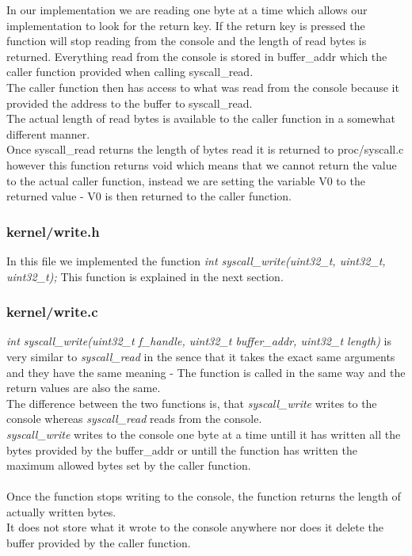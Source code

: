 \documentclass[a4paper,12pt,danish]{report}
\begin{document}
In our implementation we are reading one byte at a time which allows our implementation to look for the return key. If the return key is pressed the function will stop reading from the console and the length of read bytes is returned. Everything read from the console is stored in buffer\_addr which the caller function provided when calling syscall\_read.\\
The caller function then has access to what was read from the console because it provided the address to the buffer to syscall\_read.
\\
The actual length of read bytes is available to the caller function in a somewhat different manner.
\\
Once syscall\_read returns the length of bytes read it is returned to proc/syscall.c however this function returns void which means that we cannot return the value to the actual caller function, instead we are setting the variable V0 to the returned value - V0 is then returned to the caller function.
\subsubsection{kernel/write.h}
In this file we implemented the function \textit{int syscall\_write(uint32\_t, uint32\_t, uint32\_t);}
This function is explained in the next section.
\subsubsection{kernel/write.c}
\textit{int syscall\_write(uint32\_t f\_handle, uint32\_t buffer\_addr, uint32\_t length)} is very similar to \textit{syscall\_read} in the sence that it takes the exact same arguments and they have the same meaning - The function is called in the same way and the return values are also the same.
\\
The difference between the two functions is, that \textit{syscall\_write} writes to the console whereas \textit{syscall\_read} reads from the console.
\\
\textit{syscall\_write} writes to the console one byte at a time untill it has written all the bytes provided by the buffer\_addr or untill the function has written the maximum allowed bytes set by the caller function.
\\
\\
Once the function stops writing to the console, the function returns the length of actually written bytes.
\\
It does not store what it wrote to the console anywhere nor does it delete the buffer provided by the caller function.
\end{document}
